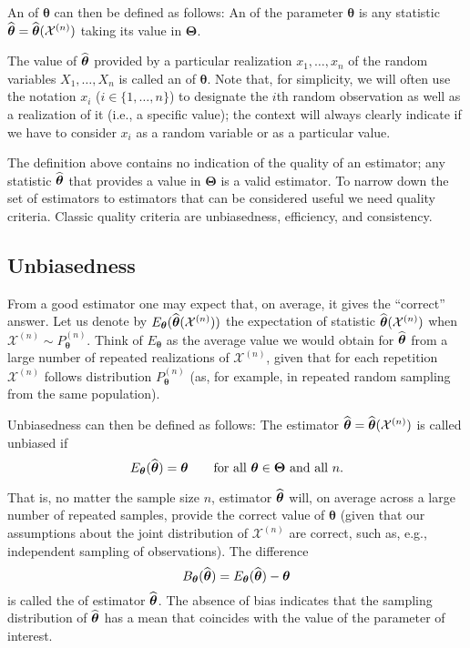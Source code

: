 An \emph{} of $\boldsymbol\theta$ can then be defined as
follows: An  of the parameter $\boldsymbol\theta$ is any
statistic $\widehat{\boldsymbol\theta} =
\widehat{\boldsymbol\theta}(\mathcal{X}^{(n)})$ taking its value in
$\boldsymbol\Theta$.

The value of $\widehat{\boldsymbol\theta}$ provided by a particular realization $x_1,\ldots,x_n$
of the random variables $X_1, \dots, X_n$ is called an
\emph{} of $\boldsymbol\theta$. Note that, for simplicity, we
will often use the notation $x_i$ ($i \in \{1, \dots, n\}$) to designate the
$i$th random observation as well as a realization of it (i.e., a specific
value); the context will always clearly indicate if we have to consider
$x_i$ as a random variable or as a particular value.

The definition above contains no indication of the quality of an estimator; any
statistic $\widehat{\boldsymbol\theta}$ that provides a value in
$\boldsymbol\Theta$ is a valid estimator. To narrow down the set of estimators
to estimators that can be considered useful we need quality criteria. Classic
quality criteria are unbiasedness, efficiency, and consistency.

\subsection{Unbiasedness}
\Index[unbiasedness]{}

From a good estimator one may expect that, on average, it gives the “correct”
answer. Let us denote by
$E_{\boldsymbol\theta}(\widehat{\boldsymbol\theta}(\mathcal{X}^{(n)}))$ the
expectation of statistic $\widehat{\boldsymbol\theta}(\mathcal{X}^{(n)})$ when
$\mathcal{X}^{(n)} \sim P_{\boldsymbol\theta}^{(n)}$. Think of
$E_{\boldsymbol\theta}$ as the average value we would obtain for
$\widehat{\boldsymbol\theta}$ from a large number of repeated realizations of
$\mathcal{X}^{(n)}$, given that for each repetition $\mathcal{X}^{(n)}$ follows
distribution $P_{\boldsymbol\theta}^{(n)}$ (as, for example, in repeated random
sampling from the same population).

Unbiasedness can then be defined as follows:
The estimator $\widehat{\boldsymbol\theta} = \widehat{\boldsymbol\theta} 
(\mathcal{X}^{(n)})$ is called unbiased if
\[
    E_{\boldsymbol\theta}(\widehat{\boldsymbol\theta}) = \boldsymbol\theta
    \qquad
    \text{for all $\boldsymbol\theta \in \boldsymbol\Theta$ and all $n$}.
\]

That is, no matter the sample size $n$, estimator $\widehat{\boldsymbol\theta}$
will, on average across a large number of repeated samples, provide the correct
value of $\boldsymbol\theta$ (given that our assumptions about the joint distribution of
$\mathcal{X}^{(n)}$ are correct, such as, e.g., independent sampling of
observations). The difference
\[
    B_{\boldsymbol\theta}(\widehat{\boldsymbol\theta}) 
        = E_{\boldsymbol\theta}(\widehat{\boldsymbol\theta}) - \boldsymbol\theta
\]
is called the \emph{} of estimator $\widehat{\boldsymbol\theta}$.
The absence of bias indicates that the sampling distribution of
$\widehat{\boldsymbol\theta}$ has a mean that coincides with the value of the
parameter of interest.

